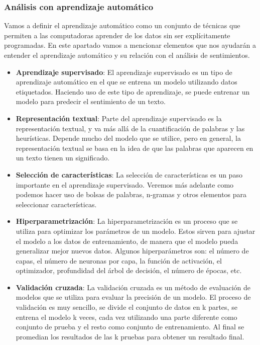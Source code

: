 \documentclass[12pt, conference]{IEEEtran}
\begin{document}
\subsubsection{Análisis con aprendizaje automático}
Vamos a definir el aprendizaje automático como un conjunto de técnicas que permiten a las computadoras aprender de los datos sin ser explícitamente programadas. En este apartado vamos a mencionar elementos que nos ayudarán a entender el aprendizaje automático y su relación con el análisis de sentimientos.

\begin{itemize}
\item \textbf{Aprendizaje supervisado}: El aprendizaje supervisado es un tipo de aprendizaje automático en el que se entrena un modelo utilizando datos etiquetados. Haciendo uso de este tipo de aprendizaje, se puede entrenar un modelo para predecir el sentimiento de un texto.
\item \textbf{Representación textual}: Parte del aprendizaje supervisado es la representación textual, y va más allá de la cuantificación de palabras y las heurísticas. Depende mucho del modelo que se utilice, pero en general, la representación textual se basa en la idea de que las palabras que aparecen en un texto tienen un significado.
\item \textbf{Selección de características}: La selección de características es un paso importante en el aprendizaje supervisado. Veremos más adelante como podemos hacer uso de bolsas de palabras, n-gramas y otros elementos para seleccionar características.
\item \textbf{Hiperparametrización}: La hiperparametrización es un proceso que se utiliza para optimizar los parámetros de un modelo. Estos sirven para ajustar el modelo a los datos de entrenamiento, de manera que el modelo pueda generalizar mejor nuevos datos. Algunos hiperparámetros son: el número de capas, el número de neuronas por capa, la función de activación, el optimizador, profundidad del árbol de decisión, el número de épocas, etc.
\item \textbf{Validación cruzada}: La validación cruzada es un método de evaluación de modelos que se utiliza para evaluar la precisión de un modelo. El proceso de validación es muy sencillo, se divide el conjunto de datos en k partes, se entrena el modelo k veces, cada vez utilizando una parte diferente como conjunto de prueba y el resto como conjunto de entrenamiento. Al final se promedian los resultados de las k pruebas para obtener un resultado final.
\end{itemize}
\end{document}

